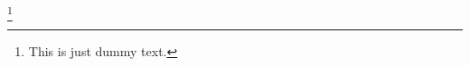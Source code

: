 \documentclass{article}
\begin{document}
	
\fbox
{
	\begin{minipage}{0.75\textwidth}
		\lipsum[1] %
	\end{minipage}
}	


\vspace{2cm}
	
	
	{
		\begin{minipage}{0.75\textwidth}
			\lipsum[1] \footnote{This is just dummy text.}
		\end{minipage}
	}
	
	
\end{document}
